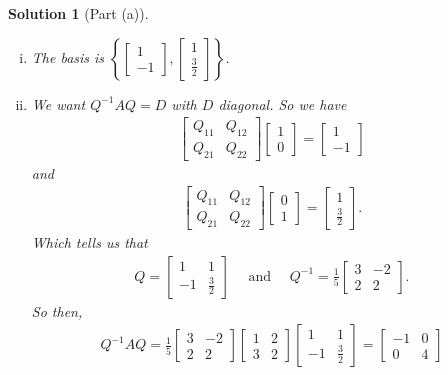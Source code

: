 \documentclass[leqno]{article}
\theoremstyle{nonumberplain}
\newtheorem{solution}{Solution}
\begin{document}
\begin{solution}[Part (a)]
\begin{enumerate}[i)]
\item The basis is $\left\{\begin{bmatrix} 1 \\ -1\end{bmatrix},\begin{bmatrix} 1 \\ \frac{3}{2} \end{bmatrix}\right\}$. 

\item We want $Q^{-1}AQ=D$ with $D$ diagonal.  So we have
\begin{align*}
\begin{bmatrix}
Q_{11} & Q_{12}\\
Q_{21} & Q_{22}
\end{bmatrix}
\begin{bmatrix}
1\\
0
\end{bmatrix}
=\begin{bmatrix}
1\\
-1
\end{bmatrix}
\end{align*}
and
\begin{align*}
\begin{bmatrix}
Q_{11} & Q_{12}\\
Q_{21} & Q_{22}
\end{bmatrix}
\begin{bmatrix}
0\\
1
\end{bmatrix}
=\begin{bmatrix}
1\\
\frac{3}{2}
\end{bmatrix}.
\end{align*}
Which tells us that 
\begin{align*}
Q=\begin{bmatrix}
1 & 1\\
-1 & \frac{3}{2}
\end{bmatrix} \textrm{~~~ and ~~~}
Q^{-1}=\frac{1}{5}\begin{bmatrix}
3 & -2\\
2 & 2
\end{bmatrix}.
\end{align*}
So then,
\begin{align*}
Q^{-1}AQ=
\frac{1}{5}\begin{bmatrix}
3 & -2\\
2 & 2
\end{bmatrix}
\begin{bmatrix}
1 & 2\\
3 & 2
\end{bmatrix}
\begin{bmatrix}
1 & 1\\
-1 & \frac{3}{2}
\end{bmatrix}=
\begin{bmatrix}
-1 & 0\\
0 & 4
\end{bmatrix}
\end{align*}

\end{enumerate}
\end{solution}
\end{document}
